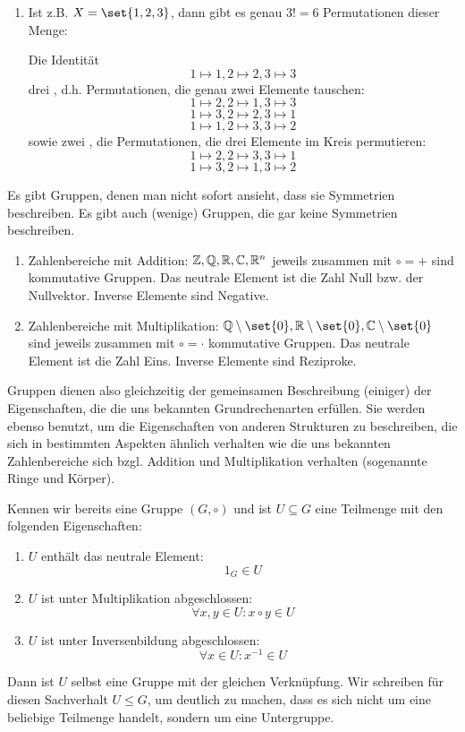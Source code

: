 \begin{example}[Symmetriegruppen]
\begin{enumerate}
\item Ist z.B. $X=\set{1,2,3}$, dann gibt es genau $3!=6$ Permutationen dieser Menge:

Die Identität
\[1\mapsto 1, 2\mapsto 2, 3\mapsto 3\]
drei , d.h. Permutationen, die genau zwei Elemente tauschen:
\[1\mapsto 2, 2\mapsto 1, 3\mapsto 3\]
\[1\mapsto 3, 2\mapsto 2, 3\mapsto 1\]
\[1\mapsto 1, 2\mapsto 3, 3\mapsto 2\]
sowie zwei , die Permutationen, die drei Elemente im Kreis permutieren:
\[1\mapsto 2, 2\mapsto 3, 3\mapsto 1\]
\[1\mapsto 3, 2\mapsto 1, 3\mapsto 2\]
\end{enumerate}
\end{example}

\begin{example}
Es gibt Gruppen, denen man nicht sofort ansieht, dass sie Symmetrien beschreiben. Es gibt auch (wenige) Gruppen, die gar keine Symmetrien beschreiben.

\begin{enumerate}
\item Zahlenbereiche mit Addition: $\mathbb{Z},\mathbb{Q},\mathbb{R},\mathbb{C},\mathbb{R}^n$ jeweils zusammen mit $\circ=+$ sind kommutative Gruppen. Das neutrale Element ist die Zahl Null bzw. der Nullvektor. Inverse Elemente sind Negative.
\item Zahlenbereiche mit Multiplikation: $\IQ\setminus\set{0},\IR\setminus\set{0},\IC\setminus\set{0}$ sind jeweils zusammen mit $\circ=\cdot$ kommutative Gruppen. Das neutrale Element ist die Zahl Eins. Inverse Elemente sind Reziproke.
\end{enumerate}

Gruppen dienen also gleichzeitig der gemeinsamen Beschreibung (einiger) der Eigenschaften, die die uns bekannten Grundrechenarten erfüllen. Sie werden ebenso benutzt, um die Eigenschaften von anderen Strukturen zu beschreiben, die sich in bestimmten Aspekten ähnlich verhalten wie die uns bekannten Zahlenbereiche sich bzgl. Addition und Multiplikation verhalten (sogenannte Ringe und Körper).
\end{example}

\begin{definition}[Untergruppen]
Kennen wir bereits eine Gruppe $(G,\circ)$ und ist $U\subseteq G$ eine Teilmenge mit den folgenden Eigenschaften:
\begin{enumerate}[label=(UG\arabic*)]
\item $U$ enthält das neutrale Element:
\[1_G\in U\]
\item $U$ ist unter Multiplikation abgeschlossen:
\[\forall x,y\in U: x\circ y\in U\]
\item $U$ ist unter Inversenbildung abgeschlossen:
\[\forall x\in U: x^{-1}\in U\]
\end{enumerate}
Dann ist $U$ selbst eine Gruppe mit der gleichen Verknüpfung. Wir schreiben für diesen Sachverhalt $U\leq G$, um deutlich zu machen, dass es sich nicht um eine beliebige Teilmenge handelt, sondern um eine Untergruppe.
\end{definition}

